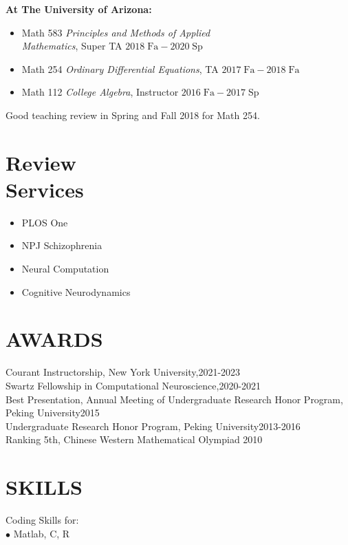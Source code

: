 \documentclass[margin, 11pt]{res} %
\begin{document}
\begin{resume}
{\bf At The University of Arizona:}
\begin{itemize}
\item Math 583 {\sl Principles and Methods of Applied \\ Mathematics}, Super TA \hfill $2018\;\mathrm{Fa}-2020\;\mathrm{Sp}$ 
\item Math 254 {\sl Ordinary Differential Equations}, TA \hfill $2017\;\mathrm{Fa}-2018\;\mathrm{Fa}$
\item Math 112 {\sl College Algebra}, Instructor \hfill $2016\;\mathrm{Fa}-2017\;\mathrm{Sp}$
\end{itemize}
Good teaching review in Spring and Fall 2018 for Math 254. 


\section{Review \\ Services}
\begin{itemize}
    \item PLOS One
    \item NPJ Schizophrenia
    \item Neural Computation
    \item Cognitive Neurodynamics
\end{itemize}

\section{AWARDS}
\label{Awards}
Courant Instructorship, New York University,\hfill 2021-2023\\
Swartz Fellowship in Computational Neuroscience,\hfill 2020-2021\\
Best Presentation, Annual Meeting of Undergraduate Research Honor Program, Peking University\hfill 2015\\
Undergraduate Research Honor Program, Peking University\hfill 2013-2016\\
Ranking 5th, Chinese Western Mathematical Olympiad \hfill 2010\\

\section{SKILLS}
\label{Skills}

Coding Skills for:\\
$\bullet$  Matlab, C, R\\

\end{resume}
\end{document}
